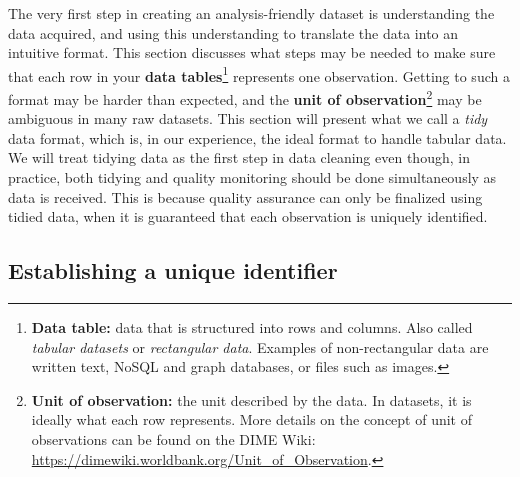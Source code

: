\documentclass[
]{book}
\begin{document}
The very first step in creating an analysis-friendly dataset
is understanding the data acquired,
and using this understanding to translate the data into an intuitive format.
This section discusses what steps may be needed to make sure that each row
in your \textbf{data tables}\footnote{\textbf{Data table:}
  data that is structured into rows and columns.
  Also called \emph{tabular datasets} or \emph{rectangular data}.
  Examples of non-rectangular data are written text,
  NoSQL and graph databases, or files such as images.}
represents one observation.
Getting to such a format may be harder than expected,
and the \textbf{unit of observation}\footnote{\textbf{Unit of observation:}
  the unit described by the data. In datasets, it is ideally what each row represents.
  More details on the concept of unit of observations
  can be found on the DIME Wiki:
  \url{https://dimewiki.worldbank.org/Unit_of_Observation}.}
may be ambiguous in many raw datasets.
This section will present what we call a \emph{tidy} data format,
which is, in our experience, the ideal format to handle tabular data.
We will treat tidying data as the first step in data cleaning even though, in practice,
both tidying and quality monitoring should be done simultaneously as data is received.
This is because quality assurance can only be finalized using tidied data,
when it is guaranteed that each observation is uniquely identified.

\hypertarget{establishing-a-unique-identifier}{%
\subsection*{Establishing a unique identifier}\label{establishing-a-unique-identifier}}
\end{document}
